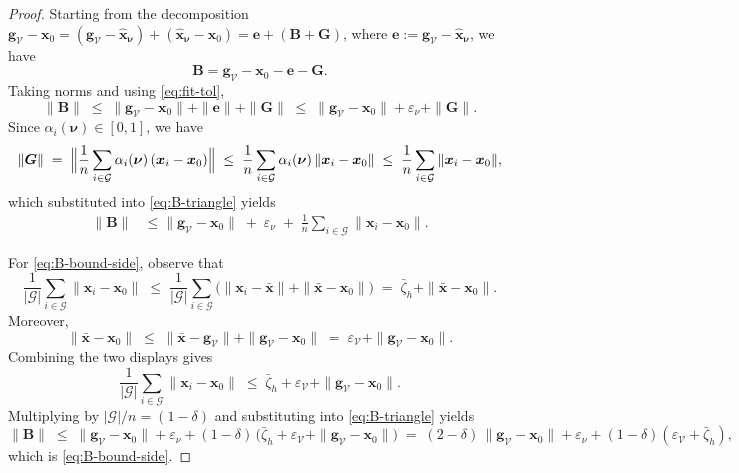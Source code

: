 \documentclass{article}
\theoremstyle{plain}
\theoremstyle{definition}
\theoremstyle{remark}
\begin{document}
\begin{proof}
Starting from the decomposition $\bm{g}_{\mathcal{V}}-\bm{x}_0
= (\bm{g}_{\mathcal{V}}-\hat{\bm{x}}_{\bm{\nu}}) + (\hat{\bm{x}}_{\bm{\nu}}-\bm{x}_0)
= \bm{e} + (\bm{B}+\bm{G})$, where $\bm{e}:=\bm{g}_{\mathcal{V}}-\hat{\bm{x}}_{\bm{\nu}}$,
we have
\begin{equation*}
	\bm{B}
	= \bm{g}_{\mathcal{V}}-\bm{x}_0 - \bm{e} - \bm{G}.
\end{equation*}
Taking norms and using \eqref{eq:fit-tol},
\begin{equation}
	\|\bm{B}\|
	\;\le\;
	\bigl\|\bm{g}_{\mathcal{V}}-\bm{x}_0\bigr\|
	+ \|\bm{e}\|
	+ \|\bm{G}\|
	\;\le\;
	\bigl\|\bm{g}_{\mathcal{V}}-\bm{x}_0\bigr\|
	+ \varepsilon_\nu
	+ \|\bm{G}\|.
\label{eq:B-triangle}
\end{equation}
Since $\alpha_i(\bm{\nu})\in[0,1]$, we have
\[
	\|\bm{G}\|
	\;=\;
	\Bigl\|\frac{1}{n}\sum_{i\in\mathcal{G}} \alpha_i(\bm{\nu})\,(\bm{x}_i-\bm{x}_0)\Bigr\|
	\;\le\;
	\frac{1}{n}\sum_{i\in\mathcal{G}} \alpha_i(\bm{\nu})\,\|\bm{x}_i-\bm{x}_0\|
	\;\le\;
	\frac{1}{n}\sum_{i\in\mathcal{G}}\|\bm{x}_i-\bm{x}_0\|,
\]
which substituted into \eqref{eq:B-triangle} yields
\begin{align*}
	\|\bm{B}\|
	&\le
	\bigl\|\bm{g}_{\mathcal{V}}-\bm{x}_0\bigr\|
	\;+\;
	\varepsilon_\nu
	\;+\;
	\frac{1}{n}
	\sum_{i\in\mathcal{G}}\|\bm{x}_i-\bm{x}_0\|.
\end{align*}

For \eqref{eq:B-bound-side}, observe that
\[
	\frac{1}{|\mathcal{G}|}\sum_{i\in\mathcal{G}}\|\bm{x}_i-\bm{x}_0\|
	\;\le\;
	\frac{1}{|\mathcal{G}|}\sum_{i\in\mathcal{G}}
	\bigl(\|\bm{x}_i-\bar{\bm{x}}\| + \|\bar{\bm{x}}-\bm{x}_0\|\bigr)
	\;=\;
	\bar{\zeta}_h + \|\bar{\bm{x}}-\bm{x}_0\|.
\]
Moreover,
\[
	\|\bar{\bm{x}}-\bm{x}_0\|
	\;\le\;
	\|\bar{\bm{x}}-\bm{g}_{\mathcal{V}}\| + \|\bm{g}_{\mathcal{V}}-\bm{x}_0\|
	\;=\;
	\varepsilon_{\mathcal{V}} + \|\bm{g}_{\mathcal{V}}-\bm{x}_0\|.
\]
Combining the two displays gives
\[
	\frac{1}{|\mathcal{G}|}\sum_{i\in\mathcal{G}}\|\bm{x}_i-\bm{x}_0\|
	\;\le\;
	\bar{\zeta}_h + \varepsilon_{\mathcal{V}} + \|\bm{g}_{\mathcal{V}}-\bm{x}_0\|.
\]
Multiplying by $|\mathcal{G}|/n=(1-\delta)$ and substituting into
\eqref{eq:B-triangle} yields
\[
	\|\bm{B}\|
	\;\le\;
	\|\bm{g}_{\mathcal{V}}-\bm{x}_0\| + \varepsilon_\nu
	+ (1-\delta)\,\bigl(\bar{\zeta}_h + \varepsilon_{\mathcal{V}} + \|\bm{g}_{\mathcal{V}}-\bm{x}_0\|\bigr)
	\;=\;
	(2-\delta)\,\|\bm{g}_{\mathcal{V}}-\bm{x}_0\|
	+ \varepsilon_\nu + (1-\delta)(\varepsilon_{\mathcal{V}}+\bar{\zeta}_h),
\]
which is \eqref{eq:B-bound-side}.
\end{proof}
\end{document}
